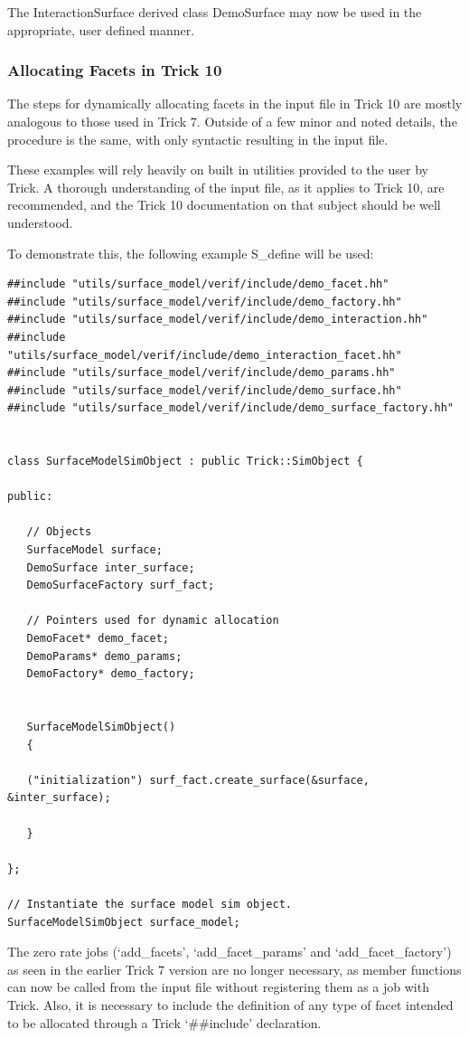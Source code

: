 The InteractionSurface derived class DemoSurface may now be used in
the appropriate, user defined manner.

\subsubsection{Allocating Facets in Trick 10}

The steps for dynamically allocating facets in the input file in Trick 10 are
mostly analogous to those used in Trick 7. Outside of a few minor and noted
details, the procedure is the same, with only syntactic resulting in the input file.

These examples will rely heavily on built in utilities provided to the user by Trick.
A thorough understanding of the input file, as it applies to Trick 10, are
recommended, and the Trick 10 documentation on that subject should be well understood.

To demonstrate this, the following
example S\_define will be used:

\begin{verbatim}
##include "utils/surface_model/verif/include/demo_facet.hh"
##include "utils/surface_model/verif/include/demo_factory.hh"
##include "utils/surface_model/verif/include/demo_interaction.hh"
##include "utils/surface_model/verif/include/demo_interaction_facet.hh"
##include "utils/surface_model/verif/include/demo_params.hh"
##include "utils/surface_model/verif/include/demo_surface.hh"
##include "utils/surface_model/verif/include/demo_surface_factory.hh"


class SurfaceModelSimObject : public Trick::SimObject {

public:

   // Objects
   SurfaceModel surface;
   DemoSurface inter_surface;
   DemoSurfaceFactory surf_fact;

   // Pointers used for dynamic allocation
   DemoFacet* demo_facet; 
   DemoParams* demo_params;
   DemoFactory* demo_factory;


   SurfaceModelSimObject() 
   {
      
   ("initialization") surf_fact.create_surface(&surface, &inter_surface);

   }

};

// Instantiate the surface model sim object.
SurfaceModelSimObject surface_model;
\end{verbatim}

The zero rate jobs (`add\_facets', `add\_facet\_params' and `add\_facet\_factory') as seen
in the earlier Trick 7 version are no longer necessary, as member functions can now be called from
the input file without registering them as a job with Trick. Also, it is necessary to include the definition
of any type of facet intended to be allocated through a Trick `\#\#include' declaration.

